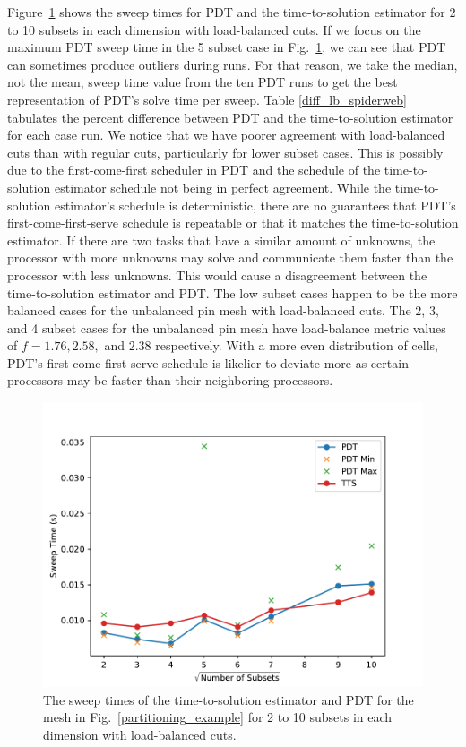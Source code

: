Figure~\ref{comp_lb_spiderweb} shows the sweep times for PDT and the time-to-solution estimator for 2 to 10 subsets in each dimension with load-balanced cuts.
If we focus on the maximum PDT sweep time in the 5 subset case in Fig.~\ref{comp_lb_spiderweb}, we can see that PDT can sometimes produce outliers during runs.
For that reason, we take the median, not the mean, sweep time value from the ten PDT runs to get the best representation of PDT's solve time per sweep.
Table \ref{diff_lb_spiderweb} tabulates the percent difference between PDT and the time-to-solution estimator for each case run.
We notice that we have poorer agreement with load-balanced cuts than with regular cuts, particularly for lower subset cases.
This is possibly due to the first-come-first scheduler in PDT and the schedule of the time-to-solution estimator schedule not being in perfect agreement.
While the time-to-solution estimator's schedule is deterministic, there are no guarantees that PDT's first-come-first-serve schedule is repeatable or that it matches the time-to-solution estimator.
If there are two tasks that have a similar amount of unknowns, the processor with more unknowns may solve and communicate them faster than the processor with less unknowns.
This would cause a disagreement between the time-to-solution estimator and PDT.
The low subset cases happen to be the more balanced cases for the unbalanced pin mesh with load-balanced cuts.
The 2, 3, and 4 subset cases for the unbalanced pin mesh have load-balance metric values of $f = 1.76, 2.58,$ and $2.38$ respectively.
With a more even distribution of cells, PDT's first-come-first-serve schedule is likelier to deviate more as certain processors may be faster than their neighboring processors.
\begin{figure}[!ht]
  \centering
  \includegraphics[scale=0.75]{../../figures/spiderweb_lb_pdtvtts.pdf}
  \caption{The sweep times of the time-to-solution estimator and PDT for the mesh in Fig.~\ref{partitioning_example} for 2 to 10 subsets in each dimension with load-balanced cuts.}
\label{comp_lb_spiderweb}
\end{figure}
